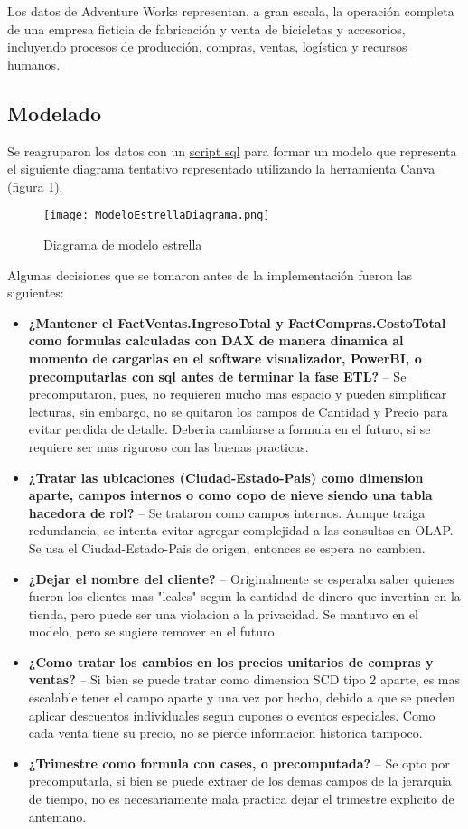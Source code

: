 \documentclass{article}
\begin{document}
Los datos de Adventure Works representan, a gran escala, la operación completa de una empresa ficticia de fabricación y venta de bicicletas y accesorios, incluyendo procesos de producción, compras, ventas, logística y recursos humanos.

\subsection {Modelado}
Se reagruparon los datos con un \href{www.google.com}{script sql} para formar un modelo que representa el siguiente diagrama tentativo representado utilizando la herramienta Canva (figura \ref{fig:DiagramaEstrella}). 
\begin{figure}
    \centering
    \texttt{[image: ModeloEstrellaDiagrama.png]}
    \caption{Diagrama de modelo estrella}
    \label{fig:DiagramaEstrella}
\end{figure}
Algunas decisiones que se tomaron antes de la implementación fueron las siguientes:
\begin{itemize}
    \item \textbf{¿Mantener el FactVentas.IngresoTotal y  FactCompras.CostoTotal como formulas calculadas con DAX de manera dinamica al momento de cargarlas en el software visualizador, PowerBI, o precomputarlas con sql antes de terminar la fase ETL?} -- Se precomputaron, pues, no requieren mucho mas espacio y pueden simplificar lecturas, sin embargo, no se quitaron los campos de Cantidad y Precio para evitar perdida de detalle. Deberia cambiarse a formula en el futuro, si se requiere ser mas riguroso con las buenas practicas.
    \item \textbf{¿Tratar las ubicaciones (Ciudad-Estado-Pais) como dimension aparte, campos internos o como copo de nieve siendo una tabla hacedora de rol?} -- Se trataron como campos internos. Aunque traiga redundancia, se intenta evitar agregar complejidad a las consultas en OLAP. Se usa el Ciudad-Estado-Pais de origen, entonces se espera no cambien.
    \item \textbf{¿Dejar el nombre del cliente?} -- Originalmente se esperaba saber quienes fueron los clientes mas "leales" segun la cantidad de dinero que invertian en la tienda, pero puede ser una violacion a la privacidad. Se mantuvo en el modelo, pero se sugiere remover en el futuro.
    \item \textbf{¿Como tratar los cambios en los precios unitarios de compras y ventas?} -- Si bien se puede tratar como dimension SCD tipo 2 aparte, es mas escalable tener el campo aparte y una vez por hecho, debido a que se pueden aplicar descuentos individuales segun cupones o eventos especiales. Como cada venta tiene su precio, no se pierde informacion historica tampoco. 
    \item \textbf{¿Trimestre como formula con cases, o precomputada?} -- Se opto por precomputarla, si bien se puede extraer de los demas campos de la jerarquia de tiempo, no es necesariamente mala practica dejar el trimestre explicito de antemano.
\end{itemize}
\end{document}

